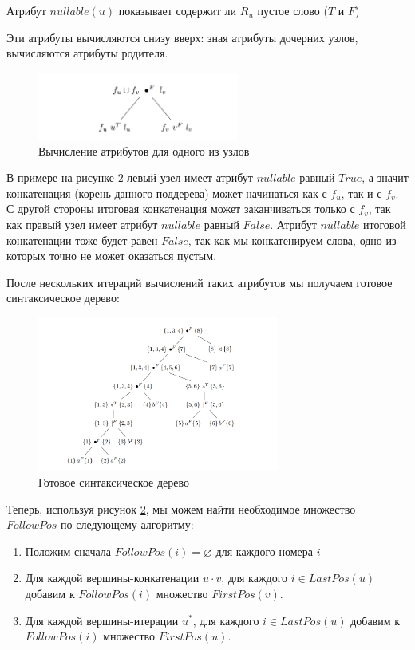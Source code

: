 \begin{Def}
    Атрибут $nullable(u)$ показывает содержит ли $R_u$ пустое слово ($T$ и $F$)
\end{Def}

Эти атрибуты вычисляются снизу вверх: зная атрибуты дочерних
узлов, вычисляются атрибуты родителя.
\begin{figure}[h!tp]
    \centering
    \includegraphics[width = 250px]{images/7.PNG}
    \caption{Вычисление атрибутов для одного из узлов}
    \label{fig:SampleNode}
\end{figure}

В примере на рисунке $2$ левый узел имеет атрибут $nullable$ равный $True$, а значит конкатенация (корень данного поддерева) может начинаться как с $f_u$, так и с $f_v$. С другой стороны итоговая конкатенация может заканчиваться только с $f_v$, так как правый узел имеет атрибут $nullable$ равный $False$. Атрибут $nullable$ итоговой конкатенации тоже будет равен $False$, так как мы конкатенируем слова, одно из которых точно не может оказаться пустым.


После нескольких итераций вычислений таких атрибутов мы получаем готовое синтаксическое дерево:
\newpage
\begin{figure}[h!t!p]
    \centering
    \includegraphics[width = 300px]{images/FullSintTree.PNG}
    \caption{Готовое синтаксическое дерево}
    \label{fig:SyntaxTree2}
\end{figure}


Теперь, используя рисунок \ref{fig:SyntaxTree2}, мы можем найти необходимое множество $FollowPos$ по следующему алгоритму:
\begin{enumerate}
    \item Положим сначала $FollowPos(i) = \varnothing$ для каждого номера $i$
    \item Для каждой вершины-конкатенации $u\cdot v$, для каждого $i \in LastPos(u)$ добавим к $FollowPos(i)$ множество $FirstPos(v)$.
    \item Для каждой вершины-итерации $u^{*}$, для каждого $i \in LastPos(u)$ добавим к
          \\$FollowPos(i)$  множество $FirstPos(u)$.
\end{enumerate}

